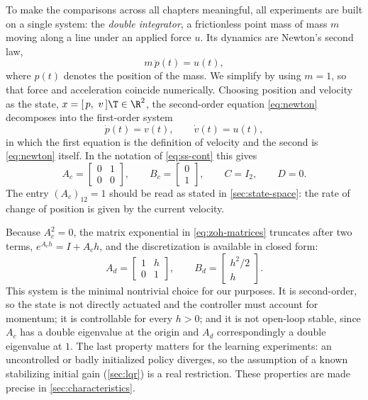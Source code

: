To make the comparisons across all chapters
meaningful, all experiments are built on a single system: the
\emph{double integrator}, a frictionless point mass of mass $m$ moving along a
line under an applied force $u$. Its dynamics are Newton's second law,
\begin{equation}
    \label{eq:newton}
    m \, \ddot{p}(t) = u(t),
\end{equation}
where $p(t)$ denotes the position of the mass. We simplify by using $m = 1$, so that
force and acceleration coincide numerically. Choosing position and velocity as
the state, $x = [\,p,\ v\,]\T \in \R^{2}$, the second-order equation
\eqref{eq:newton} decomposes into the first-order system
\begin{equation}
    \label{eq:di-first-order}
    \dot{p}(t) = v(t),
    \qquad
    \dot{v}(t) = u(t),
\end{equation}
in which the first equation is the definition of velocity and the second is
\eqref{eq:newton} itself. In the notation of \eqref{eq:ss-cont} this gives
\begin{equation}
    \label{eq:di-cont-matrices}
    A_c = \begin{bmatrix} 0 & 1 \\ 0 & 0 \end{bmatrix},
    \qquad
    B_c = \begin{bmatrix} 0 \\ 1 \end{bmatrix},
    \qquad
    C = I_2, \qquad D = 0 .
\end{equation}
The entry $(A_c)_{12} = 1$ should be read as stated in \cref{sec:state-space}:
the rate of change of position is given by the current velocity.
 
Because $A_c^{2} = 0$, the matrix exponential in
\eqref{eq:zoh-matrices} truncates after two terms, $e^{A_c h} = I + A_c h$, and
the discretization is available in closed form:
\begin{equation}
    \label{eq:di-disc-matrices}
    A_d = \begin{bmatrix} 1 & h \\ 0 & 1 \end{bmatrix},
    \qquad
    B_d = \begin{bmatrix} h^{2}/2 \\ h \end{bmatrix}.
\end{equation}
This system is the minimal nontrivial choice for our purposes. It is
second-order, so the state is not directly actuated and the controller must
account for momentum; it is controllable for every $h > 0$; and it is not
open-loop stable, since $A_c$ has a double eigenvalue at the origin and $A_d$
correspondingly a double eigenvalue at $1$. The last property matters for the
learning experiments: an uncontrolled or badly initialized policy diverges, so
the assumption of a known stabilizing initial gain (\cref{sec:lqr}) is a real
restriction. These properties are made precise in
\cref{sec:characteristics}.


